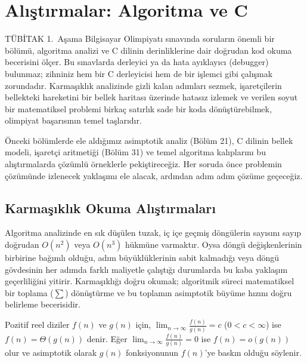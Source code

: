 \chapter{Alıştırmalar: Algoritma ve C}

TÜBİTAK 1.~Aşama Bilgisayar Olimpiyatı sınavında soruların önemli bir bölümü, algoritma analizi ve C dilinin derinliklerine dair doğrudan kod okuma becerisini ölçer. Bu sınavlarda derleyici ya da hata ayıklayıcı (debugger) bulunmaz; zihniniz hem bir C derleyicisi hem de bir işlemci gibi çalışmak zorundadır. Karmaşıklık analizinde gizli kalan adımları sezmek, işaretçilerin bellekteki hareketini bir bellek haritası üzerinde hatasız izlemek ve verilen soyut bir matematiksel problemi birkaç satırlık sade bir koda dönüştürebilmek, olimpiyat başarısının temel taşlarıdır.

Önceki bölümlerde ele aldığımız asimptotik analiz (Bölüm 21), C dilinin bellek modeli, işaretçi aritmetiği (Bölüm 31) ve temel algoritma kalıplarını bu alıştırmalarda çözümlü örneklerle pekiştireceğiz. Her soruda önce problemin çözümünde izlenecek yaklaşımı ele alacak, ardından adım adım çözüme geçeceğiz.

\section{Karmaşıklık Okuma Alıştırmaları}

Algoritma analizinde en sık düşülen tuzak, iç içe geçmiş döngülerin sayısını sayıp doğrudan $O(n^2)$ veya $O(n^3)$ hükmüne varmaktır. Oysa döngü değişkenlerinin birbirine bağımlı olduğu, adım büyüklüklerinin sabit kalmadığı veya döngü gövdesinin her adımda farklı maliyetle çalıştığı durumlarda bu kaba yaklaşım geçerliliğini yitirir. Karmaşıklığı doğru okumak; algoritmik süreci matematiksel bir toplama ($\sum$) dönüştürme ve bu toplamın asimptotik büyüme hızını doğru belirleme becerisidir.

\begin{definition}
Pozitif reel diziler $f(n)$ ve $g(n)$ için, $\lim_{n \to \infty} \frac{f(n)}{g(n)} = c$ ($0 < c < \infty$) ise $f(n) = \Theta(g(n))$ denir. Eğer $\lim_{n \to \infty} \frac{f(n)}{g(n)} = 0$ ise $f(n) = o(g(n))$ olur ve asimptotik olarak $g(n)$ fonksiyonunun $f(n)$'ye baskın olduğu söylenir.
\end{definition}

